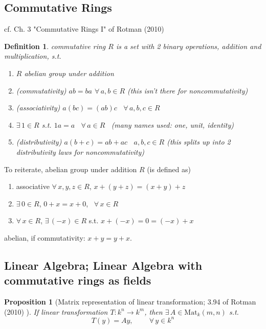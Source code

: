 \documentclass[10pt]{amsart}
\newtheorem{proposition}{Proposition}
\newtheorem{definition}{Definition}
\begin{document}
\begin{multicols*}{2}
\section{Commutative Rings}

cf. Ch. 3 "Commutative Rings I" of Rotman (2010) \cite{JRotman2010}


\begin{definition} commutative ring $R$ is a set with 2 binary operations, addition and multiplication, s.t.
	\begin{enumerate}
		\item[(i)] $R$ abelian group under addition 
		\item[(ii)] (commutativity) $ab=ba$ \quad $\forall \, a,b \in R$  (this isn't there for noncommutativity)
		\item[(iii)] (associativity) $a(bc) = (ab)c$ \quad \, $\forall \, a,b,c\in R$
		\item[(iv)] $\exists \, 1 \in R$ s.t. $1a = a$ \, $\forall \, a  \in R$ \quad \, (many names used: one, unit, identity)
		\item[(v)] (distributivity) $a(b+c) = ab+ac$ \quad \, $a,b,c \in R$ (this splits up into 2 distributivity laws for noncommutativity)
	\end{enumerate}
\end{definition}

To reiterate, abelian group under addition $R$ (is defined as)
\begin{enumerate}
	\item associative $\forall \, x , y ,z \in R$, $x + (y+z) = (x+y)+z$ 
	\item $\exists \, 0 \in R$, $0+x = x + 0$, \, $\forall \, x \in R$ 
	\item $\forall \, x \in R$, $\exists \, (-x) \in R$ s.t. $x+(-x) = 0 = (-x) + x$
\end{enumerate}
abelian, if commutativity: $x+y=y+x$.  

\subsection{Linear Algebra; Linear Algebra with commutative rings as fields}

\begin{proposition}[Matrix representation of linear transformation; 3.94 of Rotman (2010) \cite{JRotman2010}]\label{Prop:MatRepofLinearTransform}
	If linear transformation $T: k^n \to k^m$, then $\exists \,  A \in \text{Mat}_k(m,n)$ s.t. 
	\[
	T(y) = Ay, \qquad \  \forall \, y \in k^n
	\]
\end{proposition}


\end{multicols*}
\end{document}
